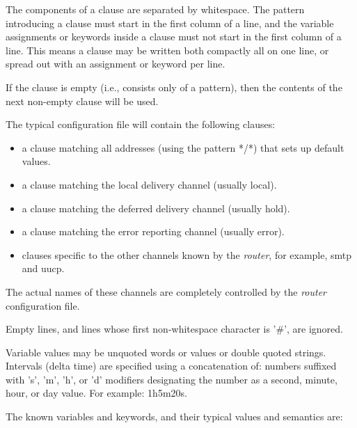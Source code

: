 The components of a clause are separated by whitespace.
The pattern introducing a clause must start in the first
column of a line, and the variable assignments or keywords
inside a clause must not start in the first  column of a
line. This means a clause may be written both compactly
all on one line, or spread out with an assignment or keyword per line.

If the clause is empty (i.e., consists only of a pattern),
then the contents of the next non-empty clause will be used.

The typical configuration file will contain the following clauses:
\begin{itemize}
\item a clause matching all addresses (using the pattern */*) that sets 
up default values.
\item a  clause  matching  the  local delivery channel
(usually local).
\item a clause matching the deferred    delivery  channel
(usually hold).
\item a  clause  matching  the error reporting channel
(usually error).
\item clauses specific to the other channels    known  by
the {\em router}, for example, smtp and uucp.
\end{itemize}


The  actual  names  of  these channels are completely 
controlled by the {\em router} configuration file.

Empty  lines,  and  lines   whose   first   non-whitespace
character is '\#', are ignored.

Variable values may be unquoted words or values or double 
quoted strings.  Intervals  (delta  time)  are  specified
using  a concatenation of: numbers suffixed with 's', 'm',
'h', or 'd' modifiers designating the number as a  second,
minute, hour, or day value.  For example: 1h5m20s.

The known variables and keywords, and their typical values
and semantics are:

